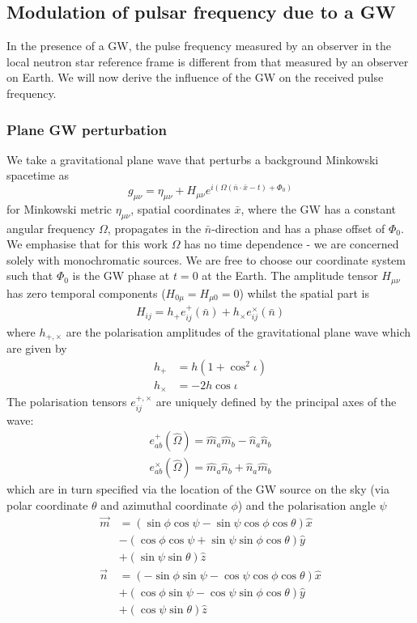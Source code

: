\documentclass[fleqn,usenatbib,useAMS]{mnras}
\begin{document}
\subsection{Modulation of pulsar frequency due to a GW} \label{sec:psr_measured}
In the presence of a GW, the pulse frequency measured by an observer in the local neutron star reference frame is different from that measured by an observer on Earth. We will now derive the influence of the GW on the received pulse frequency.

\subsubsection{Plane GW perturbation}
We take a gravitational plane wave that perturbs a background Minkowski spacetime as
\begin{equation}
	g_{\mu \nu} = \eta_{\mu \nu} + H_{\mu \nu} e^{i(\Omega(\bar{n} \cdot \bar{x} - t) + \Phi_0)	}
\end{equation}
for Minkowski metric $ \eta_{\mu \nu}$, spatial coordinates $\bar{x}$, where the GW has a constant angular frequency $\Omega$, propagates in the $\bar{n}$-direction and has a phase offset of  $\Phi_0$. We emphasise that for this work $\Omega$ has no time dependence - we are concerned solely with monochromatic sources. We are free to choose our coordinate system such that $\Phi_0$ is the GW phase at $t=0$ at the Earth. The amplitude tensor $H_{\mu \nu}$ has zero temporal components ($H_{0 \mu} = H_{\mu 0} = 0$) whilst the spatial part is
\begin{align}
	H_{ij} = h_+ e_{ij}^+(\bar{n}) + h_{\times} e_{ij}^{\times}(\bar{n})
\end{align}
where  $h_{+,\times}$ are the polarisation amplitudes of the gravitational plane wave which are given by
\begin{align}
	h_+ &= h(1 + \cos^2 \iota) \\
		h_{\times} &= -2h\cos \iota
\end{align}
The polarisation tensors $e_{ij}^{+,\times}$ are uniquely defined by the principal axes of the wave:
\begin{align}
	e_{a b}^{+}(\hat{\Omega}) =\hat{m}_a \hat{m}_b-\hat{n}_a \hat{n}_b \\
		e_{a b}^{\times}(\hat{\Omega}) =\hat{m}_a \hat{n}_b+\hat{n}_a \hat{m}_b
\end{align}
which are in turn specified via the location of the GW source on the sky (via polar coordinate $\theta$ and azimuthal coordinate $\phi$) and the polarisation angle $\psi$
\begin{align}
	\vec{m} & =(\sin \phi \cos \psi-\sin \psi \cos \phi \cos \theta) \hat{x} \nonumber \\
	& -(\cos \phi \cos \psi+\sin \psi \sin \phi \cos \theta) \hat{y} \nonumber \\
	& +(\sin \psi \sin \theta) \hat{z} \\
	\vec{n} & =(-\sin \phi \sin \psi-\cos \psi \cos \phi \cos \theta) \hat{x} \nonumber \\
	& +(\cos \phi \sin \psi-\cos \psi \sin \phi \cos \theta) \hat{y}\nonumber  \\
	& +(\cos \psi \sin \theta) \hat{z}
\end{align}
\end{document}
